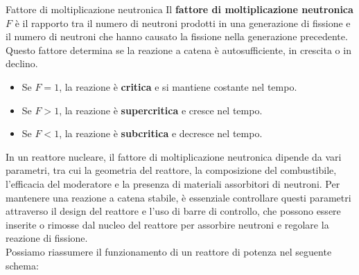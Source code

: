\begin{definition}{Fattore di moltiplicazione neutronica}
    Il \textbf{fattore di moltiplicazione neutronica} $F$ è il rapporto tra il numero di neutroni prodotti in una generazione di fissione e il numero di neutroni che hanno causato la fissione nella generazione precedente. Questo fattore determina se la reazione a catena è autosufficiente, in crescita o in declino.
    \begin{itemize}
        \item Se $F = 1$, la reazione è \textbf{critica} e si mantiene costante nel tempo.
        \item Se $F > 1$, la reazione è \textbf{supercritica} e cresce nel tempo.
        \item Se $F < 1$, la reazione è \textbf{subcritica} e decresce nel tempo.
    \end{itemize}
\end{definition}
In un reattore nucleare, il fattore di moltiplicazione neutronica dipende da vari parametri, tra cui la geometria del reattore, la composizione del combustibile, l'efficacia del moderatore e la presenza di materiali assorbitori di neutroni. Per mantenere una reazione a catena stabile, è essenziale controllare questi parametri attraverso il design del reattore e l'uso di barre di controllo, che possono essere inserite o rimosse dal nucleo del reattore per assorbire neutroni e regolare la reazione di fissione.\\
Possiamo riassumere il funzionamento di un reattore di potenza nel seguente schema:


